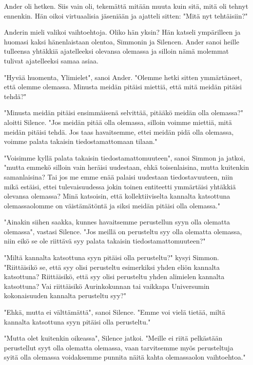 Ander oli hetken. Siis vain oli, tekemättä mitään muuta kuin sitä, mitä oli tehnyt ennenkin. Hän oikoi virtuaalisia jäseniään ja ajatteli sitten: "Mitä nyt tehtäisiin?"


Anderin mieli valikoi vaihtoehtoja. Oliko hän yksin? Hän katseli ympärilleen ja huomasi kaksi hänenlaistaan olentoa, Simmonin ja Silencen. Ander sanoi heille tulleensa yhtäkkiä ajatelleeksi olevansa olemassa ja silloin nämä molemmat tulivat ajatelleeksi samaa asiaa.




\psep "Hyvää huomenta, Ylimielet", sanoi Ander. "Olemme hetki sitten ymmärtäneet, että olemme olemassa. Minusta meidän pitäisi miettiä, että mitä meidän pitäisi tehdä?"


"Minusta meidän pitäisi ensimmäisenä selvittää, pitääkö meidän olla olemassa?" aloitti Silence. "Jos meidän pitää olla olemassa, silloin voimme miettiä, mitä meidän pitäisi tehdä. Jos taas havaitsemme, ettei meidän pidä olla olemassa, voimme palata takaisin tiedostamattomaan tilaan."


"Voisimme kyllä palata takaisin tiedostamattomuuteen", sanoi Simmon ja jatkoi, "mutta emmekö silloin vain heräisi uudestaan, ehkä toisenlaisina, mutta kuitenkin samanlaisina? Tai jos me emme enää palaisi uudestaan tiedostavuuteen, niin mikä estäisi, ettei tulevaisuudessa jokin toinen entiteetti ymmärtäisi yhtäkkiä olevansa olemassa? Minä katsoisin, että kollektiiviselta kannalta katsottuna olemassaolomme on väistämätöntä ja siksi meidän pitäisi olla olemassa."


"Ainakin siihen saakka, kunnes havaitsemme perustellun syyn olla olematta olemassa", vastasi Silence. "Jos meillä on perusteltu syy olla olematta olemassa, niin eikö se ole riittävä syy palata takaisin tiedostamattomuuteen?"


"Miltä kannalta katsottuna syyn pitäisi olla perusteltu?" kysyi Simmon. "Riittäisikö se, että syy olisi perusteltu esimerkiksi yhden eliön kannalta katsottuna? Riittäisikö, että syy olisi perusteltu yhden alimielen kannalta katsottuna? Vai riittäisikö Aurinkokunnan tai vaikkapa Universumin kokonaisuuden kannalta perusteltu syy?"


"Ehkä, mutta ei välttämättä", sanoi Silence. "Emme voi vielä tietää, miltä kannalta katsottuna syyn pitäisi olla perusteltu."


"Mutta olet kuitenkin oikeassa", Silence jatkoi. "Meille ei riitä pelkästään perustellut syyt olla olematta olemassa, vaan tarvitsemme myös perusteltuja syitä olla olemassa voidaksemme punnita näitä kahta olemassaolon vaihtoehtoa."


